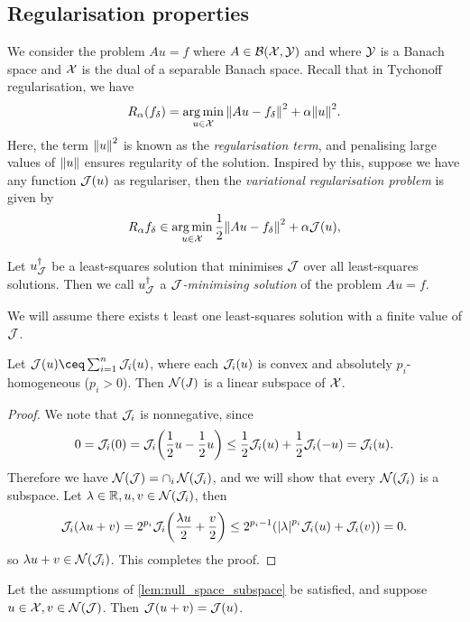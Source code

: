 \subsection{Regularisation properties}
We consider the problem $Au = f$ where $A \in \mathcal B(\mathcal X, \mathcal Y)$ and where $\mathcal Y$ is a Banach space and $\mathcal X$ is the dual of a separable Banach space.  Recall that in Tychonoff regularisation, we have
\[
R_\alpha(f_\delta) = \operatorname*{arg\,min}_{u \in \mathcal X} \norm{Au - f_\delta}^2 + \alpha \norm{u}^2. 
\]
Here, the term $\norm{u}^2$ is known as the \emph{regularisation term}, and penalising large values of $\norm{u}$ ensures regularity of the solution. Inspired by this, suppose we have any function $\mathcal J(u)$ as regulariser, then the \emph{variational regularisation problem} is given by
\[
R_\alpha f_\delta \in \operatorname*{arg\,min}_{u \in \mathcal X} \frac12 \norm{Au - f_\delta}^2 + \alpha \mathcal J(u), 
\]
\begin{definition}
	Let $u_\mathcal J^\dagger$ be a least-squares solution that minimises $\mathcal J$ over all least-squares solutions. Then we call $u_\mathcal J^\dagger$ a \emph{$\mathcal J$-minimising solution} of the problem $Au = f$. 
\end{definition}

\begin{convention}
	We will assume there exists t least one least-squares solution with a finite value of $\mathcal J$. 
\end{convention}

\begin{lemma} \label{lem:null_space_subspace}
	Let $\JJ(u) \ceq \sum_{i=1}^n \JJ_i(u)$, where each $\mathcal J_i(u)$ is convex and absolutely $p_i$-homogeneous ($p_i > 0$). Then $\operatorname{\mathcal N}(J)$ is a linear subspace of $\mathcal X$. 
\end{lemma}

\begin{proof}
	We note that $\mathcal J_i$ is nonnegative, since
	\[
	0 = \mathcal J_i(0) = \mathcal J_i\qty(\frac12 u - \frac12 u) \leq \frac12\mathcal J_i(u) + \frac12\mathcal J_i(-u) = \mathcal J_i(u).
	\]
	Therefore we have $\operatorname{\mathcal N}(\mathcal J) = \cap_i \operatorname{\mathcal N}(\mathcal J_i)$, and we will show that every $\operatorname{\mathcal N}(\mathcal J_i)$ is a subspace. Let $\lambda \in \mathbb R, u, v \in \operatorname{\mathcal N}(\mathcal J_i)$, then 
	\[
	\mathcal J_i(\lambda u + v) = 2^{p_i} \mathcal J_i\qty(\frac{\lambda u}{2} + \frac v2) \leq 2^{p_i - 1} \qty(\abs{\lambda}^{p_i} \mathcal J_i(u) + \mathcal J_i(v)) = 0. 
	\]
	so $\lambda u + v \in \operatorname{\mathcal N}(\mathcal J_i)$. This completes the proof. 
\end{proof}

\begin{lemma}
	Let the assumptions of \cref{lem:null_space_subspace} be satisfied, and suppose $u \in \mathcal X, v \in \operatorname{\mathcal N}(\mathcal J)$. Then $\mathcal J(u + v) = \mathcal J(u)$. 
\end{lemma}

